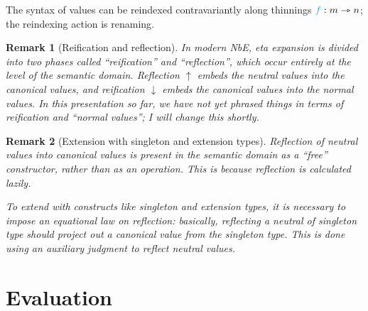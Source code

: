 \documentclass{article}
\DeclarePairedDelimiter\Squares{[}{]}
\newtheorem{remark}{Remark}
\newcommand\DeclBox[1]{\framebox{$\displaystyle{}#1$}}
\newcommand\FmtThin[1]{{\color{ProcessBlue}#1}}
\newcommand\Thin[2]{{#1}\rightarrowtriangle{#2}}
\newcommand\IsThin[3]{\FmtThin{#1}:\Thin{#2}{#3}}
\newcommand\FmtTm[1]{{\color{Violet}#1}}
\newcommand\FmtVal[1]{{\color{Red}{#1}}}
\newcommand\Eval[5]{\FmtThin{#2}*\FmtVal{#3}\vDash\FmtTm{#4}\mathrel{\Downarrow_{\FmtThin{#1}}}\FmtVal{#5}}
\newcommand\InstClo[3]{\FmtVal{#1}\bullet\FmtVal{#2}\Downarrow\FmtVal{#3}}
\begin{document}
The syntax of values can be reindexed contravariantly along
thinnings $\IsThin{f}{m}{n}$; the
reindexing action is renaming.

\begin{remark}[Reification and reflection]

  In modern NbE, eta expansion is divided into two phases called
  ``reification'' and ``reflection'', which occur entirely at the level of the
  semantic domain. Reflection $\uparrow$ embeds the neutral values into the
  canonical values, and reification $\downarrow$ embeds the canonical values
  into the normal values.
%
  In this presentation so far, we have not yet phrased things in terms of
  reification and ``normal values''; I will change this shortly.

\end{remark}


\begin{remark}[Extension with singleton and extension types]

  Reflection of neutral values into canonical values is present in the semantic
  domain as a ``free'' constructor, rather than as an operation. This is
  because reflection is calculated lazily.

  To extend with constructs like singleton and extension types, it is necessary
  to impose an equational law on reflection: basically, reflecting a neutral of
  singleton type should project out a canonical value from the singleton type.
  This is done using an auxiliary judgment to reflect neutral values.


\end{remark}


\section{Evaluation}




\end{document}
